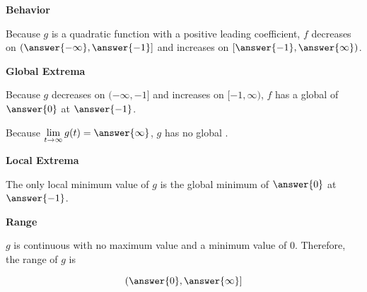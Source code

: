 \documentclass{ximera}
\begin{document}
\begin{exercise}
\begin{question}
\end{question}




\begin{question}  \textbf{\textcolor{blue!55!black}{Behavior}}



Because $g$ is a quadratic function with a positive leading coefficient, $f$ decreases on $\left( \answer{-\infty}, \answer{-1} \right]$ and increases on $\left[ \answer{-1}, \answer{\infty} \right)$. 

\end{question}









\begin{question}  \textbf{\textcolor{blue!55!black}{Global Extrema}}

Because $g$ decreases on $( -\infty, -1 ]$ and increases on $[ -1, \infty )$, $f$ has a global   of $\answer{0}$ at $\answer{-1}$.



Because $\lim\limits_{t \to \infty} g(t) = \answer{\infty}$, $g$ has no global .

\end{question}












\begin{question}  \textbf{\textcolor{blue!55!black}{Local Extrema}}

The only local minimum value of $g$ is the global minimum of $\answer{0}$ at $\answer{-1}$.

\end{question}







\begin{question}  \textbf{\textcolor{blue!55!black}{Range}}

$g$ is continuous with no maximum value and a minimum value of $0$.  Therefore, the range of $g$ is

\[
( \answer{0}, \answer{\infty} ]
\]

\end{question}


\end{exercise}
\end{document}
